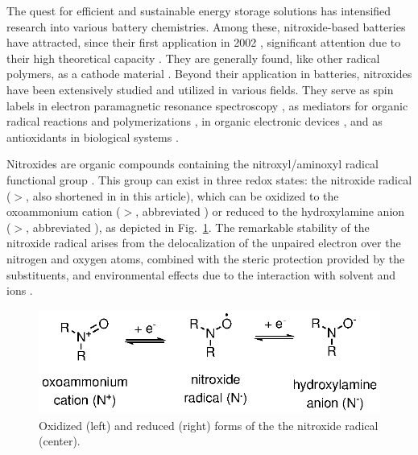 \documentclass[review,preprint]{elsarticle}
\begin{document}
The quest for efficient and sustainable energy storage solutions has intensified research into various battery chemistries. Among these, nitroxide-based batteries have attracted, since their first application in 2002 \cite{nakaharaRechargeableBatteriesOrganic2002}, significant attention due to their high theoretical capacity \cite{friebeSustainableEnergyStorage2019,ernouldNitroxidesBatteryrelatedApplications2021,keDesigningStrategiesAdvanced2023}. They are generally found, like other radical polymers, as a cathode material \cite{okaRadicalPolymersRechargeable2020a,assummaNewConductingCopolymer2020}. Beyond their application in batteries, nitroxides have been extensively studied and utilized in various fields. They serve as spin labels in electron paramagnetic resonance spectroscopy \cite{torricellaNitroxideSpinLabels2021}, as mediators for organic radical reactions and polymerizations \cite{tebbenNitroxidesApplicationsSynthesis2011,leifertOrganicSynthesisUsing2023}, in organic electronic devices \cite{jiAirStableOrganicRadicals2020,xieNitroxideRadicalPolymers2021}, and as antioxidants in biological systems  \cite{souleChemistryBiologyNitroxide2007,lewandowskiNitroxidesAntioxidantsAnticancer2017,prescottBiologicalRelevanceFree2017}.

Nitroxides are organic compounds containing the nitroxyl/aminoxyl radical functional group \cite{berlinerHistoryUseNitroxides2012}. This group can exist in three redox states: the nitroxide radical ($>$, also shortened in  in this article), which can be oxidized to the oxoammonium cation ($>$, abbreviated ) or reduced to the hydroxylamine anion ($>$, abbreviated ), as depicted in Fig.~\ref{fig:states}. The remarkable stability of the nitroxide radical arises from the delocalization of the unpaired electron over the nitrogen and oxygen atoms, combined with the steric protection provided by the substituents, and environmental effects due to the interaction with solvent and ions \cite{grynovaOriginScopeLongRange2013,grynovaSwitchingRadicalStability2013}. 

\begin{figure}[!h]
	\centering
	\includegraphics[width=.7\linewidth]{Figure1}
	\caption{Oxidized (left) and reduced (right) forms of the the nitroxide radical (center).}
	\label{fig:states}
\end{figure}
\end{document}
